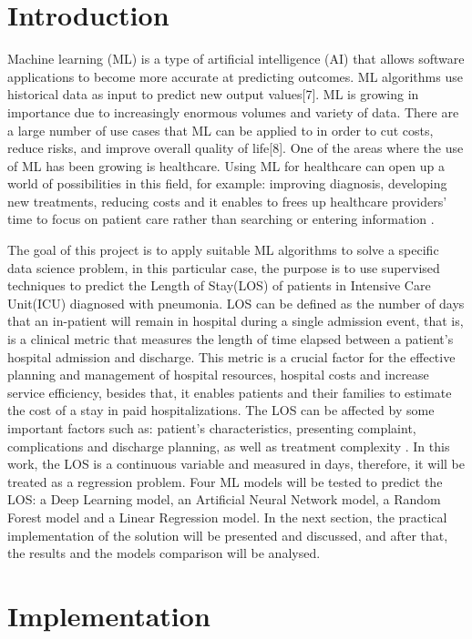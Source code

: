 \documentclass[journal]{IEEEtran} %
\begin{document}
\section{Introduction}
Machine learning (ML) is a type of artificial intelligence (AI) that allows software applications to become more accurate at predicting outcomes. ML algorithms use historical data as input to predict new output values[7].
ML is growing in importance due to increasingly enormous volumes and variety of data. There are a large number of use cases that ML can be applied to in order to cut costs, reduce risks, and improve overall quality of life[8].
One of the areas where the use of ML has been growing is healthcare. Using ML for healthcare can open up a world of possibilities in this field, for example: improving diagnosis, developing new treatments, reducing costs and it enables to frees up healthcare providers' time to focus on patient care rather than searching or entering information \cite{JAVAID202258}.\newline

The goal of this project is to apply suitable ML algorithms to solve a specific data science problem, in this particular case, the purpose is to use supervised techniques to predict the Length of Stay(LOS) of patients in Intensive Care Unit(ICU) diagnosed with pneumonia. LOS can be defined as the number of days that an in-patient will remain in hospital during a single admission event, that is, is a clinical metric that measures the length of time elapsed between a patient's hospital admission and discharge. This metric is a crucial factor for the effective planning and management of hospital resources, hospital costs and increase service efficiency, besides that, it enables patients and their families to estimate the cost of a stay in paid hospitalizations. The LOS can be affected by some important factors such as: patient’s characteristics, presenting complaint, complications and discharge planning, as well as treatment complexity \cite{Stone2022}.\newline
In this work, the LOS is a continuous variable and measured in days, therefore, it will be treated as a regression problem. Four ML models will be tested to predict the LOS: a Deep Learning model, an Artificial Neural Network model, a Random Forest model and a Linear Regression model. In the next section, the practical implementation of the solution will be presented and discussed, and after that, the results and the models comparison will be analysed.

\section{Implementation}
\end{document}

